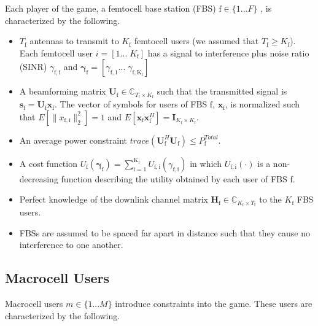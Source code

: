 \documentclass[12pt,a4paper]{report}
\begin{document}
Each player of the game, a femtocell base station (FBS) $\text{f} \in \{1 ... F\}$ , is characterized by the following.
\begin{itemize}
\item 
$T_{\text{f}}$ antennas to transmit to $K_{\text{f}}$ femtocell users (we assumed that $T_{\text{f}} \geq K_{\text{f}}$). Each femtocell user $i = [1... \;K_{\text{f}}]$ has a signal to interference plus noise ratio (SINR) $\gamma_{\mathrm{f,i}}$ and $\mathbf{\gamma}_{\text{f}} = [\gamma_{\mathrm{f,1}}...\; \gamma_{\mathrm{f,K_{\text{f}}}}]$
\\
\item 
	A beamforming matrix $\mathbf{U}_{\mathrm{f}} \in \mathbb{C}_{T_{\text{f}} \times K_{\text{f}}}$ such that the transmitted 		
	signal is $\mathbf{s}_{\mathrm{f}
	}= \mathbf{U_{\mathrm{f}}}\mathbf{x_{\mathrm{f}}}$. The 		
	vector of symbols for users of FBS $\text{f}$, $\mathbf{x_{\mathrm{f}}}$, is  normalized such that $E[\|x_{\mathrm{f,i}}
	\|_2^2]=1$ and $E[\mathbf{x}_{\mathrm{f}}\mathbf{x}_{\mathrm{f}}^H]=\mathbf{I}_{K_{\text{f}} \times K_{\text{f}}}$.
\\
\item 
	An average power constraint $trace(\mathbf{U}_{\text{f}}^H\mathbf{U}_{\text{f}}) \leq P^{Total}_{\text{f}} $.

\item 
	A cost function $U_{\text{f}}(\mathbf{\gamma}_{\text{f}}) =
	\sum_{\mathrm{i=1}}^{\mathrm{K_{\text{f}}}}
    	 U_{\mathrm{f,i}}(\gamma_{\mathrm{f,i}}) $
    	in which $U_{\mathrm{f,i}}(\cdot)$ is a non-decreasing function describing the utility obtained by each user of FBS f.

\item 
	Perfect knowledge of the downlink channel matrix $\mathbf{H_\mathrm{f}} \in \mathbb{C}_{K_{\text{f}} \times T_{\text{f}}} $ to the $K_{\text{f}}$ FBS users.
\\
\item
	 FBSs are assumed to be spaced far apart in distance such that they cause no interference to one another.
\end{itemize}

\subsection{Macrocell Users}
Macrocell users $m \in \{1 ... M\}$ introduce constraints into the game. These users are characterized by the following.
\end{document}
